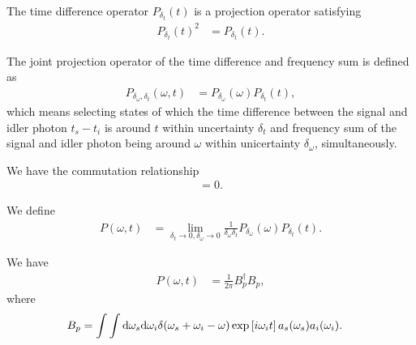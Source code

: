 \documentclass[../../note.tex]{subfiles}
\begin{document}
\begin{lemma}
    The time difference operator  $P_{\delta_{t}}(t)$ is a projection operator satisfying
    \begin{align}
        P_{\delta_{t}}(t)^2
        &= P_{\delta_{t}}(t).
    \end{align}
\end{lemma}

\begin{definition}
    The joint projection operator of the time difference and frequency sum is defined as
    \begin{align}
        P_{\delta_{\omega}, \delta_t}(\omega, t)
        &= P_{\delta_{\omega}}(\omega) P_{\delta_t}(t),
    \end{align}
    which means selecting states of which the time difference between the signal and idler photon $t_s -t_i$ is around $t$ within uncertainty $\delta_t$ and frequency sum of the signal and idler photon being around $\omega$ within unicertainty $\delta_{\omega}$, simultaneously.
\end{definition}

\begin{lemma}
    We have the commutation relationship
    \begin{align}
        [P_{\delta_{\omega}}(\omega), P_{\delta_t}(t)] = 0.
    \end{align}
\end{lemma}

\begin{definition}
    We define
    \begin{align}
        P(\omega, t)
        &= \lim_{\delta_t \rightarrow 0, \delta_{\omega} \rightarrow 0} \frac{1}{\delta_{\omega} \delta_{t}} P_{\delta_{\omega}}(\omega) P_{\delta_{t}}(t).
    \end{align}
\end{definition}

\begin{lemma}
    We have
    \begin{align}
        P(\omega, t)
        &= \frac{1}{2 \pi} B_p^\dagger B_p,
    \end{align}
    where
    \begin{align}
        B_p
        &= \int \int {\rm d}\omega_s{\rm d}\omega_i \delta(\omega_s+\omega_i-\omega) \exp\left[i \omega_i t\right] a_s(\omega_s) a_i(\omega_i).
    \end{align}
\end{lemma}
\end{document}
